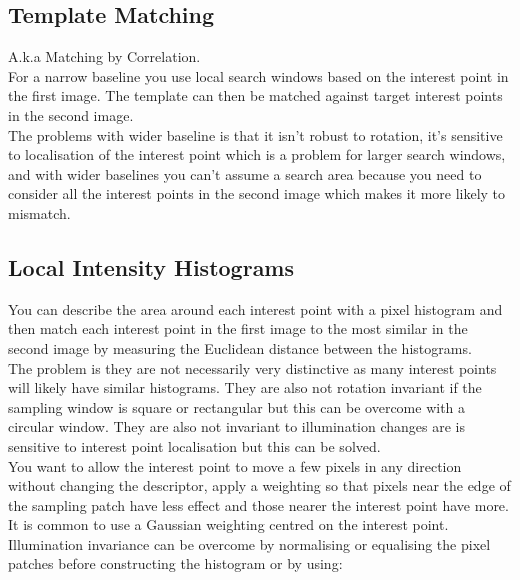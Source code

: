 \documentclass{article}
\begin{document}
	\subsection{Template Matching}
	A.k.a Matching by Correlation.\\
	For a narrow baseline you use local search windows based on the interest point in the first image. The template can then be matched against target interest points in the second image.\\
	The problems with wider baseline is that it isn't robust to rotation, it's sensitive to localisation of the interest point which is a problem for larger search windows, and with wider baselines you can't assume a search area because you need to consider all the interest points in the second image which makes it more likely to mismatch.
	\subsection{Local Intensity Histograms}
	You can describe the area around each interest point with a pixel histogram and then match each interest point in the first image to the most similar in the second image by measuring the Euclidean distance between the histograms.\\
	The problem is they are not necessarily very distinctive as many interest points will likely have similar histograms. They are also not rotation invariant if the sampling window is square or rectangular but this can be overcome with a circular window. They are also not invariant to illumination changes are is sensitive to interest point localisation but this can be solved.\\
	You want to allow the interest point to move a few pixels in any direction without changing the descriptor, apply a weighting so that pixels near the edge of the sampling patch have less effect and those nearer the interest point have more. It is common to use a Gaussian weighting centred on the interest point.\\
	Illumination invariance can be overcome by normalising or equalising the pixel patches before constructing the histogram or by using:
\end{document}
